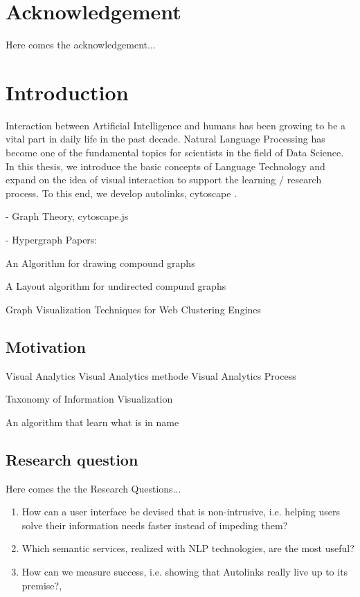 \documentclass[
    fontsize=12pt,
    headings=small,
    parskip=half,           %
    bibliography=totoc,
    numbers=noenddot,       %
    open=any,               %
    ]{scrreprt}
\begin{document}
\chapter*{Acknowledgement}

Here comes the acknowledgement...


\tableofcontents

\chapter{Introduction}

Interaction between Artificial Intelligence and humans has been growing to be a vital part in daily life in the past decade. Natural Language Processing has become one of the fundamental topics for scientists in the field of Data Science. In this thesis, we introduce the basic concepts of Language Technology and expand on the idea of visual interaction to support the learning / research process. To this end, we develop autolinks, cytoscape \cite{doi:10.1093/bioinformatics/btv557}.

- Graph Theory, cytoscape.js \cite{doi:10.1093/bioinformatics/btv557}

- Hypergraph Papers: 

An Algorithm for drawing compound graphs \cite{10.1007/3-540-46648-7_20}

A Layout algorithm for undirected compund graphs \cite{DOGRUSOZ2009980}

Graph Visualization Techniques for Web Clustering Engines \cite{4069238}

\section{Motivation}

Visual Analytics \cite{1573625}
Visual Analytics methode \cite{1333626}
Visual Analytics Process \cite{CCCW2009}

Taxonomy of Information Visualization \cite{545307}


An algorithm that learn what is in name \cite{Bikel1999}


\section{Research question}

Here comes the the Research Questions...

\begin{enumerate}
	\item How can a user interface be devised that is non-intrusive, i.e. helping users solve their information needs faster instead of impeding them?
	\item Which semantic services, realized with NLP technologies, are the most useful?
	\item How can we measure success, i.e. showing that Autolinks really live up to its premise?,
\end{enumerate}
\end{document}
